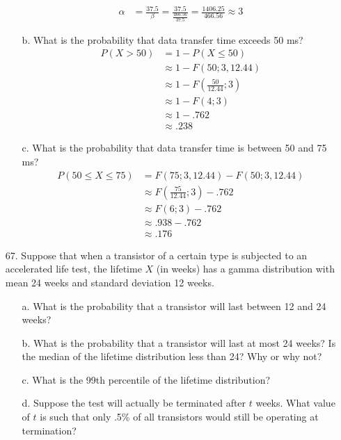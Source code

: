 \documentclass[letterpaper,12pt]{article}
\begin{document}
\begin{enumerate}
\begin{enumerate}
\begin{align*}
        \end{align*}
        \begin{align*}
          \alpha &= \frac{37.5}{\beta} = \frac{37.5}{\frac{466.56}{37.5}} = \frac{1406.25}{466.56} \approx 3
        \end{align*}
      \item[b.]
        What is the probability that data transfer time exceeds 50 ms?
        \begin{align*}
          P(X > 50) &= 1 - P(X \le 50) \\
          &\approx 1 - F(50; 3, 12.44) \\
          &\approx 1 - F\left(\frac{50}{12.44}; 3\right) \\
          &\approx 1 - F(4; 3) \\
          &\approx 1 - .762 \\
          &\approx .238
        \end{align*}
      \item[c.]
        What is the probability that data transfer time is between 50 and 75 ms?
        \begin{align*}
          P(50 \le X \le 75) &= F(75; 3, 12.44) - F(50; 3, 12.44) \\
          &\approx F\left(\frac{75}{12.44}; 3\right) - .762 \\
          &\approx F(6; 3) - .762 \\
          &\approx .938 - .762 \\
          &\approx .176
        \end{align*}
    \end{enumerate}
  \item[67.]
    Suppose that when a transistor of a certain type is subjected to an accelerated life test, the lifetime $X$ (in weeks) has a gamma distribution with mean 24 weeks and standard deviation 12 weeks.
    \begin{enumerate}
      \item[a.]
        What is the probability that a transistor will last between 12 and 24 weeks?
      \item[b.]
        What is the probability that a transistor will last at most 24 weeks? Is the median of the lifetime distribution less than 24? Why or why not?
      \item[c.]
        What is the 99th percentile of the lifetime distribution?
      \item[d.]
        Suppose the test will actually be terminated after $t$ weeks. What value of $t$ is such that only .5\% of all transistors would still be operating at termination?
    \end{enumerate}
\end{enumerate}
\end{document}
